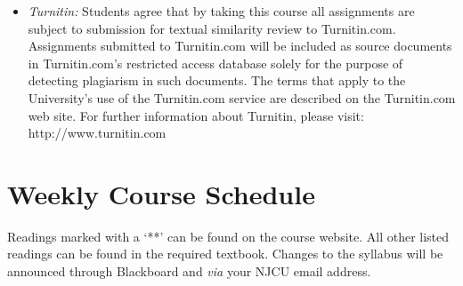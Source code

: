 \documentclass[article,oneside]{memoir}
\begin{document}
\begin{itemize}
\item \textit{Turnitin:} Students agree that by taking this course all assignments are subject to submission for textual similarity review to Turnitin.com. Assignments submitted to Turnitin.com will be included as source documents in Turnitin.com's restricted access database solely for the purpose of detecting plagiarism in such documents.  The terms that apply to the University’s use of the Turnitin.com service are described on the Turnitin.com web site.  For further information about Turnitin, please visit: http://www.turnitin.com 


\end{itemize}



\section{Weekly Course Schedule}
Readings marked with a `**' can be found on the course website. All other listed readings can be found in the required textbook. Changes to the syllabus will be announced through Blackboard and \emph{via} your NJCU email address.
\end{document}

